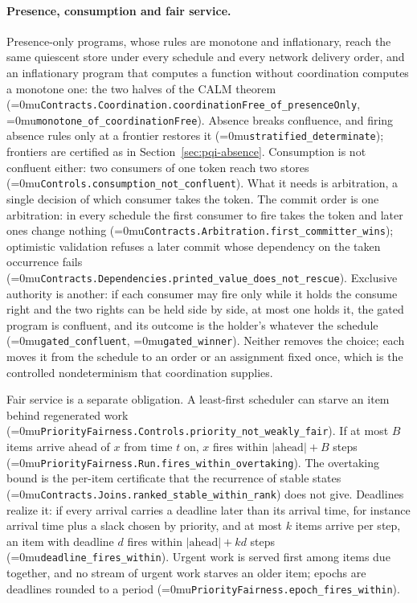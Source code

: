 \documentclass[11pt]{article}
\newcommand{\leanname}[1]{\textup{\Urlmuskip=0mu\relax\nolinkurl{#1}}}
\theoremstyle{definition}
\theoremstyle{remark}
\begin{document}
\paragraph{Presence, consumption and fair service.}
Presence-only programs, whose rules are monotone and inflationary, reach the
same quiescent store under every schedule and every network delivery order,
and an inflationary program that computes a function without coordination
computes a monotone one: the two halves of the CALM theorem
\cite{HellersteinAlvaroCALM,AmelootRelationalTransducers}
(\leanname{Contracts.Coordination.coordinationFree_of_presenceOnly},
\leanname{monotone_of_coordinationFree}).  Absence breaks confluence, and
firing absence rules only at a frontier restores it
(\leanname{stratified_determinate}); frontiers are certified as in
Section~\ref{sec:pqi-absence}.  Consumption is not confluent either: two
consumers of one token reach two stores (\leanname{Controls.consumption_not_confluent}).
What it needs is arbitration, a single decision of which consumer takes the
token.  The commit order is one arbitration: in every schedule the first
consumer to fire takes the token and later ones change nothing
(\leanname{Contracts.Arbitration.first_committer_wins}); optimistic validation
refuses a later commit whose dependency on the taken occurrence fails
(\leanname{Contracts.Dependencies.printed_value_does_not_rescue}).  Exclusive
authority is another: if each consumer may fire only while it holds the
consume right and the two rights can be held side by side, at most one holds
it, the gated program is confluent, and its outcome is the holder's whatever
the schedule (\leanname{gated_confluent}, \leanname{gated_winner}).  Neither
removes the choice; each moves it from the schedule to an order or an
assignment fixed once, which is the controlled nondeterminism that
coordination supplies.

Fair service is a separate obligation.  A least-first scheduler can starve an
item behind regenerated work (\leanname{PriorityFairness.Controls.priority_not_weakly_fair}).
If at most $B$ items arrive ahead of $x$ from time $t$ on, $x$ fires within
$|\mathrm{ahead}|+B$ steps (\leanname{PriorityFairness.Run.fires_within_overtaking}).
The overtaking bound is the per-item certificate that the recurrence of
stable states (\leanname{Contracts.Joins.ranked_stable_within_rank}) does not
give.  Deadlines realize it: if every arrival carries a deadline later than its
arrival time, for instance arrival time plus a slack chosen by priority, and
at most $k$ items arrive per step, an item with deadline $d$ fires within
$|\mathrm{ahead}|+kd$ steps (\leanname{deadline_fires_within}).  Urgent work is
served first among items due together, and no stream of urgent work starves an
older item; epochs are deadlines rounded to a period
(\leanname{PriorityFairness.epoch_fires_within}).
\end{document}
